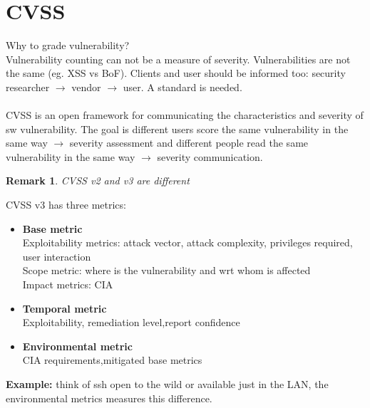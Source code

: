 \documentclass[10pt,a4paper]{book}
\newtheorem{remark}{Remark}
\begin{document}
\section{CVSS}
Why to grade vulnerability?\\
Vulnerability counting can not be a measure of severity. Vulnerabilities are not the same (eg. XSS vs BoF). Clients and user should be informed too: security researcher $\to$ vendor $\to$ user. A standard is needed.\\\\
CVSS is an open framework for communicating the characteristics and severity of sw vulnerability. The goal is different users score the same vulnerability in the same way $\to$ severity assessment and different people read the same vulnerability in the same way $\to$ severity communication.\\
\begin{remark}
CVSS v2 and v3 are different
\end{remark}
CVSS v3 has three metrics:
\begin{itemize}
\item \textbf{Base metric}\\
Exploitability metrics: attack vector, attack complexity, privileges required, user interaction\\
Scope metric: where is the vulnerability and wrt whom is affected\\
Impact metrics: CIA
\item \textbf{Temporal metric}\\
Exploitability, remediation level,report confidence
\item \textbf{Environmental metric}\\
CIA requirements,mitigated base metrics
\end{itemize}
\textbf{Example:} think of ssh open to the wild or available just in the LAN, the environmental metrics measures this difference.
\end{document}
